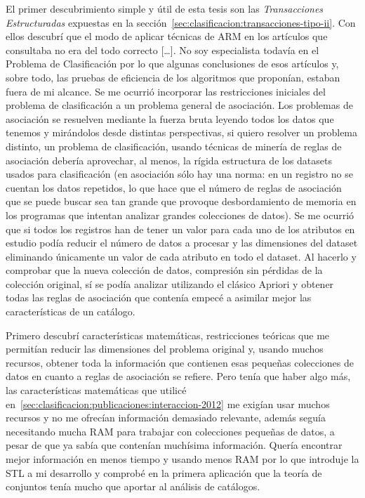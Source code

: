 El primer descubrimiento simple y útil de esta tesis son las \emph{Transacciones Estructuradas} expuestas en la sección~\ref{sec:clasificacion:transacciones-tipo-ii}. Con ellos descubrí que el modo de aplicar técnicas de ARM en los artículos que consultaba no era del todo correcto  [\ldots]. No soy especialista todavía en el Problema de Clasificación por lo que algunas conclusiones de esos artículos y, sobre todo, las pruebas de eficiencia de los algoritmos que proponían, estaban fuera de mi alcance. Se me ocurrió incorporar las restricciones iniciales del problema de clasificación a un problema general de asociación. Los problemas de asociación se resuelven mediante la fuerza bruta leyendo todos los datos que tenemos y mirándolos desde distintas perspectivas, si quiero resolver un problema distinto, un problema de clasificación, usando técnicas de minería de reglas de asociación debería aprovechar, al menos, la rígida estructura de los datasets usados para clasificación (en asociación sólo hay una norma: en un registro no se cuentan los datos repetidos, lo que hace que el número de reglas de asociación que se puede buscar sea tan grande que provoque desbordamiento de memoria en los programas que intentan analizar grandes colecciones de datos). Se me ocurrió que si todos los registros han de tener un valor para cada uno de los atributos en estudio podía reducir el número de datos a procesar y las dimensiones del dataset eliminando únicamente un valor de cada atributo en todo el dataset. Al hacerlo y comprobar que la nueva colección de datos, compresión sin pérdidas de la colección original, sí se podía analizar utilizando el clásico Apriori y obtener todas las reglas de asociación que contenía empecé a asimilar mejor las características de un catálogo.

Primero descubrí características matemáticas, restricciones teóricas que me permitían reducir las dimensiones del problema original y, usando muchos recursos, obtener toda la información que contienen esas pequeñas colecciones de datos en cuanto a reglas de asociación se refiere. Pero tenía que haber algo más, las características matemáticas que utilicé en~\ref{sec:clasificacion:publicaciones:interaccion-2012} me exigían usar muchos recursos y no me ofrecían información demasiado relevante, además seguía necesitando mucha RAM para trabajar con colecciones pequeñas de datos, a pesar de que ya sabía que contenían muchísima información. Quería encontrar mejor información en menos tiempo y usando menos RAM por lo que introduje la STL a mi desarrollo y comprobé en la primera aplicación que la teoría de conjuntos tenía mucho que aportar al análisis de catálogos.
